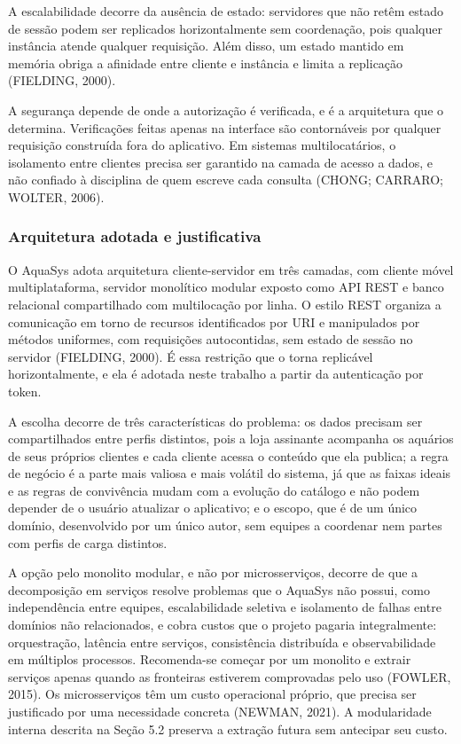 \documentclass[12pt,oneside,a4paper,brazilian]{abntex2}
\begin{document}
A escalabilidade decorre da ausência de estado: servidores que não retêm estado de sessão podem ser replicados horizontalmente sem coordenação, pois qualquer instância atende qualquer requisição. Além disso, um estado mantido em memória obriga a afinidade entre cliente e instância e limita a replicação (FIELDING, 2000).

A segurança depende de onde a autorização é verificada, e é a arquitetura que o determina. Verificações feitas apenas na interface são contornáveis por qualquer requisição construída fora do aplicativo. Em sistemas multilocatários, o isolamento entre clientes precisa ser garantido na camada de acesso a dados, e não confiado à disciplina de quem escreve cada consulta (CHONG; CARRARO; WOLTER, 2006).


\subsubsection{Arquitetura adotada e justificativa}
O AquaSys adota arquitetura cliente-servidor em três camadas, com cliente móvel multiplataforma, servidor monolítico modular exposto como API REST e banco relacional compartilhado com multilocação por linha. O estilo REST organiza a comunicação em torno de recursos identificados por URI e manipulados por métodos uniformes, com requisições autocontidas, sem estado de sessão no servidor (FIELDING, 2000). É essa restrição que o torna replicável horizontalmente, e ela é adotada neste trabalho a partir da autenticação por token.

A escolha decorre de três características do problema: os dados precisam ser compartilhados entre perfis distintos, pois a loja assinante acompanha os aquários de seus próprios clientes e cada cliente acessa o conteúdo que ela publica; a regra de negócio é a parte mais valiosa e mais volátil do sistema, já que as faixas ideais e as regras de convivência mudam com a evolução do catálogo e não podem depender de o usuário atualizar o aplicativo; e o escopo, que é de um único domínio, desenvolvido por um único autor, sem equipes a coordenar nem partes com perfis de carga distintos.

A opção pelo monolito modular, e não por microsserviços, decorre de que a decomposição em serviços resolve problemas que o AquaSys não possui, como independência entre equipes, escalabilidade seletiva e isolamento de falhas entre domínios não relacionados, e cobra custos que o projeto pagaria integralmente: orquestração, latência entre serviços, consistência distribuída e observabilidade em múltiplos processos. Recomenda-se começar por um monolito e extrair serviços apenas quando as fronteiras estiverem comprovadas pelo uso (FOWLER, 2015). Os microsserviços têm um custo operacional próprio, que precisa ser justificado por uma necessidade concreta (NEWMAN, 2021). A modularidade interna descrita na Seção 5.2 preserva a extração futura sem antecipar seu custo.
\end{document}
